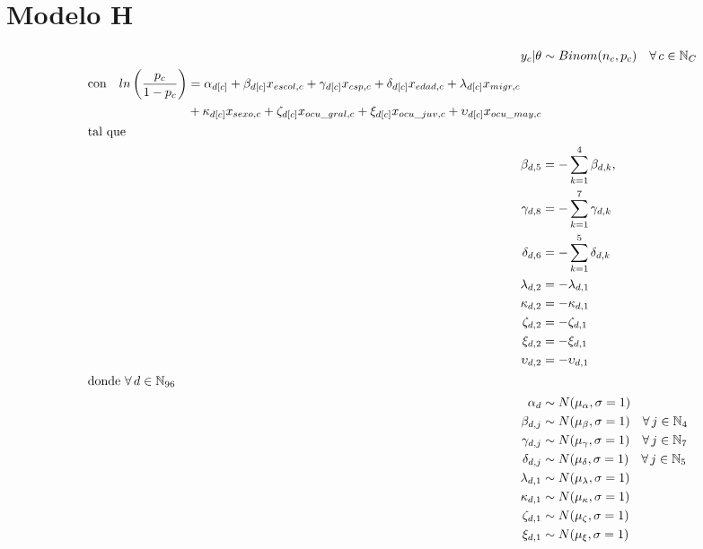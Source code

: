 \section*{Modelo H}

\begin{align}\label{eq:Modelo_Comp_H}
y_c|\theta & \sim Binom(n_c,p_c) \quad \forall \, c \in \mathbb{N}_C \nonumber \\
\begin{split}
\text{con} \quad ln\left(\dfrac{p_c}{1-p_c}\right) &= \alpha_{d[c]} + \beta_{d[c]} x_{escol,c} + \gamma_{d[c]} x_{csp,c} + \delta_{d[c]} x_{edad,c} + \lambda_{d[c]} x_{migr,c} \\
&+ \kappa_{d[c]} x_{sexo,c} + \zeta_{d[c]} x_{ocu\_gral,c} + \xi_{d[c]} x_{ocu\_juv,c} + \upsilon_{d[c]} x_{ocu\_may,c} 
\end{split}\\
\intertext{tal que} 
\beta_{d,5} &= -\sum\limits_{k = 1}^{4} \beta_{d,k}, \nonumber \\
\gamma_{d,8} &= -\sum\limits_{k = 1}^{7} \gamma_{d,k} \nonumber \\
\delta_{d,6} &= -\sum\limits_{k = 1}^{5} \delta_{d,k} \nonumber \\
\lambda_{d,2} &= -\lambda_{d,1} \nonumber \\
\kappa_{d,2} &= -\kappa_{d,1} \nonumber \\
\zeta_{d,2} &= -\zeta_{d,1} \nonumber \\
\xi_{d,2} &= -\xi_{d,1} \nonumber \\
\upsilon_{d,2} &= -\upsilon_{d,1} \nonumber \\
\intertext{donde $\forall \, d \in \mathbb{N}_{96}$}
\alpha_d &\sim N(\mu_{\alpha}, \sigma=1) \quad  \nonumber \\
\beta_{d,j} &\sim N(\mu_{\beta}, \sigma=1) \quad \forall \, j \in \mathbb{N}_{4} \nonumber \\
\gamma_{d,j} &\sim N(\mu_{\gamma}, \sigma=1) \quad \forall \, j \in \mathbb{N}_{7} \nonumber \\
\delta_{d,j} &\sim N(\mu_{\delta}, \sigma=1) \quad \forall \, j \in \mathbb{N}_{5}  \nonumber \\ 
\lambda_{d,1} &\sim N(\mu_{\lambda}, \sigma=1) \nonumber \\
\kappa_{d,1} &\sim N(\mu_{\kappa}, \sigma=1) \nonumber \\ 
\zeta_{d,1} &\sim N(\mu_{\zeta}, \sigma=1) \nonumber \\
\xi_{d,1} &\sim N(\mu_{\xi}, \sigma=1) \nonumber \\

\end{align}

